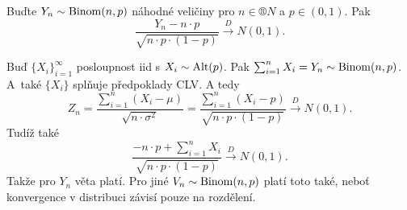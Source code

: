 \documentclass[12pt]{article}					%
\begin{document}

\begin{veta}
	Buďte $Y_n \sim \operatorname{Binom}(n, p)$ náhodné veličiny pro $n \in ®N$ a $p \in (0, 1)$. Pak
	$$ \frac{Y_n - n·p}{\sqrt{n·p·(1 - p)}} \overset{D}\rightarrow N(0, 1). $$

	\begin{dukazin}
		Buď $\{X_i\}_{i=1}^∞$ posloupnost iid s $X_i \sim \operatorname{Alt}(p)$. Pak $\sum_{i=1}^n X_i = Y_n \sim \operatorname{Binom}(n, p)$. A také $\{X_i\}$ splňuje předpoklady CLV. A tedy
		$$ Z_n = \frac{\sum_{i=1}^n (X_i - \mu)}{\sqrt{n·\sigma^2}} = \frac{\sum_{i=1}^n (X_i - p)}{\sqrt{n·p·(1 - p)}} \overset{D}\rightarrow N(0, 1). $$
		Tudíž také
		$$ \frac{-n·p + \sum_{i=1}^n X_i}{\sqrt{n·p·(1 - p)}} \overset{D} \rightarrow N(0, 1). $$
		Takže pro $Y_n$ věta platí. Pro jiné $V_n \sim \operatorname{Binom}(n, p)$ platí toto také, neboť konvergence v distribuci závisí pouze na rozdělení.
	\end{dukazin}
\end{veta}
\end{document}
